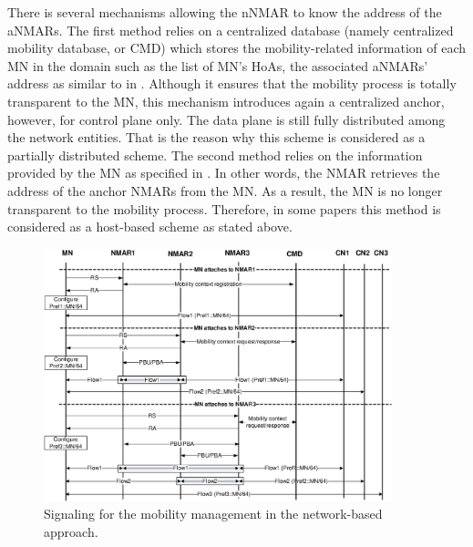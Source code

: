 There is several mechanisms allowing the nNMAR to know the address of the aNMARs. The first method \cite{DMA} relies on a centralized database (namely centralized mobility database, or CMD) which stores the mobility-related information of each MN in the domain such as the list of MN's HoAs, the associated aNMARs' address as similar to in \cite{inter_domain_DMM}. Although it ensures that the mobility process is totally transparent to the MN, this mechanism introduces again a centralized anchor, however, for control plane only. The data plane is still fully distributed among the network entities. That is the reason why this scheme is considered as a partially distributed scheme. The second method relies on the information provided by the MN as specified in \cite{PMIP_based_DMM_Giust}. In other words, the NMAR retrieves the address of the anchor NMARs from the MN. As a result, the MN is no longer transparent to the mobility process. Therefore, in some papers \cite{DMM_analysis_Hassan, DMM_IETF_Lee} this method is considered as a host-based scheme as stated above. 
\begin{figure}[h!] 
 \begin{center} 
 \includegraphics[width=0.9\textwidth]{./Part1/Chapter2/figures/c3_pmip_dmm_signaling.eps} 
    \caption{Signaling for the mobility management in the network-based approach.}
     \label{fig:c3_pmip_dmm_signaling}
  \end{center} 
\end{figure}

